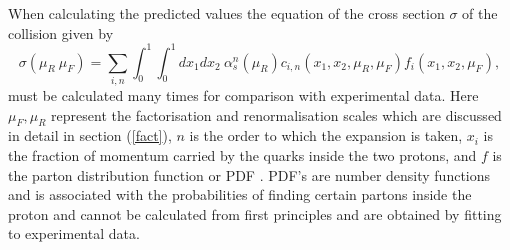 \documentclass[12pt, onecolumn, nofootinbib]{revtex4}    %
\begin{document}
When calculating the predicted values the equation of the cross section ${\sigma}$ of the collision given by \begin{equation} \label{xsectioneqn} \sigma(\mu_R \ \mu_F) = \sum_{i,n} \int_{0}^{1} \int_{0}^{1} dx_1 dx_2 \ \alpha_s^n (\mu_R) c_{i,n} \left( x_1, x_2, \mu_R, \mu_F \right) f_i(x_1, x_2, \mu_F),\end{equation} must be calculated many times for comparison with experimental data. Here ${\mu_F, \mu_R}$ represent the factorisation and renormalisation scales which are discussed in detail in section (\ref{fact}),  ${n}$ is the order to which the expansion is taken, ${x_i}$ is the fraction of momentum carried by the quarks inside the two protons, and ${f}$ is the parton distribution function or PDF  \cite{BOOK}. PDF's are number density functions and is associated with the probabilities of finding certain partons inside the proton and cannot be calculated from first principles and are obtained by fitting to experimental data. %
\end{document}
